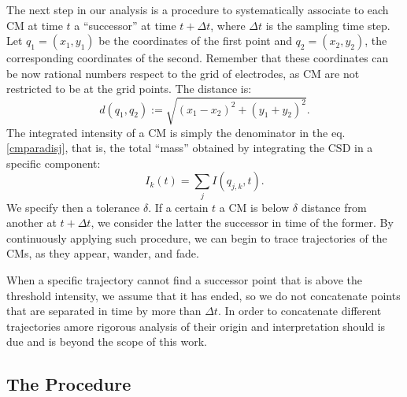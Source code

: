 \documentclass[12pt]{article}
\begin{document}
The next step in our analysis is a procedure to systematically associate to each CM
at time $t$ a ``successor'' at time $t+\Delta t$, where $\Delta t$ is the sampling
time step. Let $q_1=(x_1, y_1)$ be the coordinates of the first point and $q_2=(x_2,y_2)$,
the corresponding coordinates of the second.
Remember that these coordinates can be now
rational numbers
respect to the grid of electrodes,
as CM are not restricted to be  at the grid points.
The distance is:
\begin{equation}
d(q_1,q_2):=\sqrt{(x_1-x_2)^2+(y_1+y_2)^2}.
\end{equation}
The integrated intensity of a CM is simply the denominator in the
eq. \ref{cmparadisj},
that is, the total ``mass'' obtained by integrating the CSD in a specific component:
\begin{equation}
  I_k(t)=\sum_j I (q_{j,k}, t).
\end{equation}
We specify then a tolerance $\delta$. If a certain $t$ a CM is below $\delta$ distance from another at $t+\Delta t$, we consider the latter the successor in time of the former. By continuously applying such procedure, we can begin to trace trajectories of the CMs, as they appear, wander, and fade. 

When a specific trajectory cannot find a successor point that is above the
threshold intensity, we assume that it has ended, so we do not concatenate
points that are separated in time by more than $\Delta t$.
In order to concatenate different
trajectories amore rigorous analysis of their origin and interpretation
should is due and is beyond the scope of this work.



 \subsection{The Procedure}
 
\end{document}
